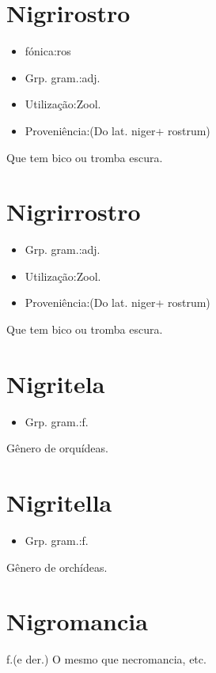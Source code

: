 \section{Nigrirostro}
\begin{itemize}
\item {fónica:ros}
\end{itemize}
\begin{itemize}
\item {Grp. gram.:adj.}
\end{itemize}
\begin{itemize}
\item {Utilização:Zool.}
\end{itemize}
\begin{itemize}
\item {Proveniência:(Do lat. \textunderscore niger\textunderscore  + \textunderscore rostrum\textunderscore )}
\end{itemize}
Que tem bico ou tromba escura.
\section{Nigrirrostro}
\begin{itemize}
\item {Grp. gram.:adj.}
\end{itemize}
\begin{itemize}
\item {Utilização:Zool.}
\end{itemize}
\begin{itemize}
\item {Proveniência:(Do lat. \textunderscore niger\textunderscore  + \textunderscore rostrum\textunderscore )}
\end{itemize}
Que tem bico ou tromba escura.
\section{Nigritela}
\begin{itemize}
\item {Grp. gram.:f.}
\end{itemize}
Gênero de orquídeas.
\section{Nigritella}
\begin{itemize}
\item {Grp. gram.:f.}
\end{itemize}
Gênero de orchídeas.
\section{Nigromancia}
\textunderscore f.\textunderscore  (e der.)
O mesmo que \textunderscore necromancia\textunderscore , etc.
